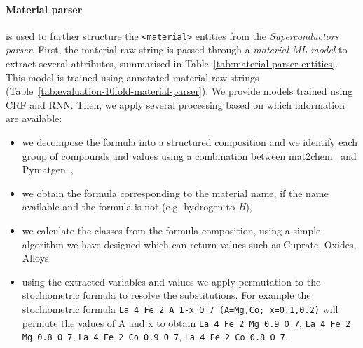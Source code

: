 \documentclass{article}
\begin{document}
\paragraph{Material parser} is used to further structure the \texttt{<material>} entities from the \textit{Superconductors parser}. 
First, the material raw string is passed through a \textit{material ML model} to extract several attributes, summarised in Table~\ref{tab:material-parser-entities}. 
This model is trained using annotated material raw strings (Table~\ref{tab:evaluation-10fold-material-parser}). 
We provide models trained using CRF and RNN.
Then, we apply several processing based on which information are available: 
\begin{itemize}
    \item we decompose the formula into a structured composition and we identify each group of compounds and values using a combination between mat2chem~\cite{kononova_text-mined_2019} and Pymatgen~\cite{Ong2013}, 
    \item we obtain the formula corresponding to the material name, if the name available and the formula is not (e.g. hydrogen to \textit{H}), 
    \item we calculate the classes from the formula composition, using a simple algorithm we have designed which can return values such as Cuprate, Oxides, Alloys 
    \item using the extracted variables and values we apply permutation to the stochiometric formula to resolve the substitutions. For example the stochiometric formula \texttt{La 4 Fe 2 A 1-x O 7 (A=Mg,Co; x=0.1,0.2)} will permute the values of A and x to obtain \texttt{La 4 Fe 2 Mg 0.9 O 7}, \texttt{La 4 Fe 2 Mg 0.8 O 7}, \texttt{La 4 Fe 2 Co 0.9 O 7}, \texttt{La 4 Fe 2 Co 0.8 O 7}.
\end{itemize}
\end{document}
